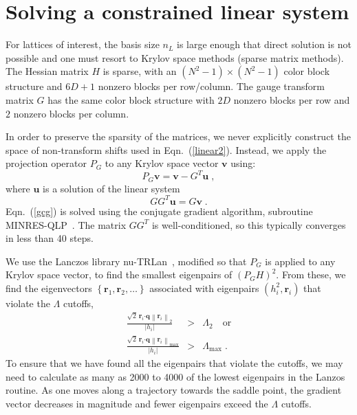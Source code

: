 \documentclass[preprint,aps,prd]{revtex4-2}
\newcommand{\be}{\begin{equation}}
\newcommand{\eq}{\end{equation}}
\newcommand{\heigen}{h}
\begin{document}
\section{Solving a constrained linear system}
\label{krylov}

For lattices of interest, the basis size $n_L$ is large enough
that direct solution is not possible and one must resort to Krylov
space methods (sparse matrix methods).
The Hessian matrix $H$ is sparse, with an $(N^2-1)\times(N^2-1)$
color block structure and $6D+1$ nonzero blocks per row/column.
The gauge transform matrix $G$ has the same color block structure
with $2 D$ nonzero blocks per row and $2$ nonzero blocks per column.

In order to preserve the sparsity of the matrices, we never
explicitly construct the space of non-transform shifts used in
Eqn.~(\ref{linear2}).  Instead, we apply the projection
operator $P_G$ to any Krylov space vector $\mathbf{v}$ using:
\be
    P_G \mathbf{v} = \mathbf{v} - G^T \mathbf{u} \; ,
\eq
where $\mathbf{u}$ is a solution of the linear system
\be
  G G^T \mathbf{u} = G \mathbf{v} \; .\label{gcg}
\eq
Eqn.~(\ref{gcg}) is solved using the conjugate gradient
algorithm, subroutine MINRES-QLP~\cite{choi_algorithm_2014}.
The matrix $G G^T$ is well-conditioned, so this typically converges
in less than 40 steps.

We use the Lanczos library nu-TRLan~\cite{yamazaki_adaptive_2010},
modified so that $P_G$ is applied to any Krylov space vector, to
find the smallest eigenpairs of $\left(P_G H\right)^2$.  From these, we find
the eigenvectors $\left\{\mathbf{r}_1, \mathbf{r}_2, \ldots\right\}$
associated with eigenpairs $\left(\heigen_i^2, \mathbf{r}_i\right)$
that violate the $\Lambda$ cutoffs,
%
\begin{eqnarray}
   \frac{\sqrt{2}\, \mathbf{r}_i \mathbf{\cdot} \mathbf{q}
   \left\lVert \mathbf{r}_i\right\rVert_2}{\left|\heigen_i\right| }
     &>& \Lambda_2  \quad\mbox{or} \\
   \frac{\sqrt{2}\, \mathbf{r}_i\mathbf{\cdot} \mathbf{q}
   \left\lVert \mathbf{r}_i\right\rVert_\mathrm{max}}{\left|\heigen_i\right| }
     &>& \Lambda_\mathrm{max} \; .
\end{eqnarray}
%
To ensure that we have found all the eigenpairs that violate the cutoffs,
we may need to calculate as many as 2000 to 4000 of the lowest eigenpairs
in the Lanzos routine.  As one moves along a trajectory towards the
saddle point, the gradient vector decreases in magnitude and fewer eigenpairs
exceed the $\Lambda$ cutoffs.
\end{document}
